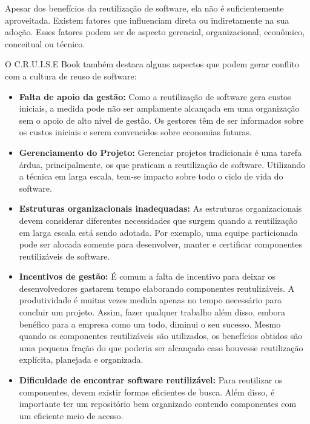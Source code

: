 Apesar dos benefícios da reutilização de software, ela não é suficientemente aproveitada. Existem fatores que influenciam direta ou indiretamente na sua adoção. Esses fatores podem ser de aspecto gerencial, organizacional, econômico, conceitual ou técnico.


O C.R.U.I.S.E Book \citep{cruise2007} também destaca alguns aspectos que podem gerar conflito com a cultura de reuso de software:

\begin{itemize}
	
\item \textbf{Falta de apoio da gestão:} Como a reutilização de software gera custos iniciais,
a medida pode não ser amplamente alcançada em uma organização sem o apoio de alto nível de gestão. Os gestores têm de ser informados sobre os custos iniciais e serem convencidos sobre economias futuras.

\item \textbf{Gerenciamento do Projeto:} Gerenciar projetos tradicionais é uma tarefa árdua, principalmente, os que praticam a reutilização de software. Utilizando a técnica em larga escala, tem-se impacto sobre todo o ciclo de vida do software.

\item \textbf{Estruturas organizacionais inadequadas:} As estruturas organizacionais devem
considerar diferentes necessidades que surgem quando a reutilização em larga escala está sendo adotada. Por exemplo, uma equipe particionada pode ser alocada somente para desenvolver, manter e certificar componentes reutilizáveis de software.

\item \textbf{Incentivos de gestão:} É comum a falta de incentivo para deixar os desenvolvedores gastarem tempo elaborando componentes reutulizáveis. A produtividade é muitas vezes medida apenas no tempo necessário para concluir um projeto. Assim, fazer qualquer trabalho além disso, embora benéfico para a empresa como um todo, diminui o seu sucesso. Mesmo quando os componentes reutilizáveis são utilizados, os benefícios obtidos são uma pequena fração do que poderia ser alcançado caso houvesse reutilização explícita, planejada e organizada.

\item \textbf{Dificuldade de encontrar software reutilizável:} Para reutilizar os componentes, devem existir formas eficientes de busca. Além disso, é importante ter um repositório bem organizado contendo componentes com um eficiente meio de acesso.


\end{itemize}
